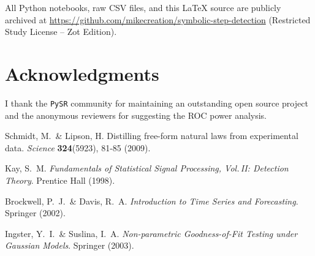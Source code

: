\documentclass[11pt,a4paper]{article}
\begin{document}
All Python notebooks, raw CSV files, and this \LaTeX{} source are
publicly archived at
\url{https://github.com/mikecreation/symbolic-step-detection} (Restricted Study License – Zot Edition).

\section*{Acknowledgments}

I thank the \texttt{PySR} community for maintaining an outstanding open
source project and the anonymous reviewers for suggesting the ROC power
analysis.


\begin{thebibliography}{9}
Schmidt, M.\ \& Lipson, H.  
Distilling free-form natural laws from experimental data.  
\emph{Science} \textbf{324}(5923), 81-85 (2009).

Kay, S.~M.  
\emph{Fundamentals of Statistical Signal Processing, Vol.\,II:
Detection Theory}.  Prentice Hall (1998).

Brockwell, P.~J.\ \& Davis, R.~A.  
\emph{Introduction to Time Series and Forecasting}.  Springer (2002).

Ingster, Y.~I.\ \& Suslina, I.~A.  
\emph{Non-parametric Goodness-of-Fit Testing under Gaussian Models}.  
Springer (2003).
\end{thebibliography}
\end{document}
